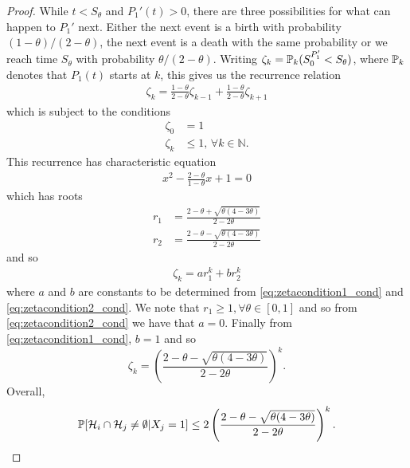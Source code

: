 \begin{proof}
		 While $t < S_\theta$ and $P_1'(t) > 0$, there are three possibilities for what can happen to $P_1'$ next. Either the next event is a birth with probability $(1 - \theta)/(2 - \theta)$, the next event is a death with the same probability or we reach time $S_\theta$ with probability $\theta/(2 - \theta)$. Writing $\zeta_k = \mathbb{P}_k(S_0^{P_1'} < S_\theta)$, where $\mathbb{P}_k$ denotes that $P_1(t)$ starts at $k$, this gives us the recurrence relation
		 \begin{align}
		 	\zeta_k = \frac{1 - \theta}{2 - \theta} \zeta_{k-1} + \frac{1 - \theta}{2 - \theta} \zeta_{k+1}
		 \end{align}
		 which is subject to the conditions 
		 \begin{align}
		 	\label{eq:zetacondition1_cond}
		 	\zeta_0 &= 1\\
		 	\zeta_k &\leq 1, \, \forall k \in \mathbb{N}.
		 	\label{eq:zetacondition2_cond}
		 \end{align} 
		 This recurrence has characteristic equation
		 \begin{align}
		 	x^2 - \frac{2 -\theta}{1 - \theta} x + 1 = 0
		 \end{align}
		 which has roots
		 \begin{align}
		 	r_1 &= \frac{2 - \theta + \sqrt{\theta(4 - 3\theta)}}{2 - 2\theta}\\
		 	r_2 &= \frac{2 - \theta - \sqrt{\theta(4 - 3\theta)}}{2 - 2\theta}
		 \end{align}
		 and so
		 \begin{align}
		 	\zeta_k = a r_1^k + b r_2^k
		 \end{align}
		 where $a$ and $b$ are constants to be determined from \eqref{eq:zetacondition1_cond} and \eqref{eq:zetacondition2_cond}. We note that $r_1 \geq 1, \forall \theta \in [0,1]$ and so from \eqref{eq:zetacondition2_cond} we have that $a = 0$. Finally from \eqref{eq:zetacondition1_cond}, $b = 1$ and so
		 \begin{equation}
		 	\zeta_k = \left(\frac{2 - \theta - \sqrt{\theta(4 - 3\theta)}}{2 - 2\theta}\right)^k.
		 \end{equation}
		 Overall,
		 \begin{equation}
			\mathbb{P}[\mathcal{H}_i \cap \mathcal{H}_j \neq \emptyset|X_{j} = 1] \leq 2\left(\frac{2 - \theta - \sqrt{\theta(4 - 3\theta)}}{2 - 2\theta}\right)^k.
		\end{equation}
	\end{proof}